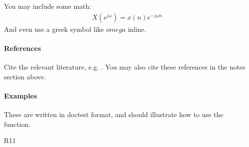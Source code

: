 \documentclass[letterpaper,10pt,english]{sphinxmanual}
\begin{document}
\begin{fulllineitems}
You may include some math:
\begin{equation*}
\begin{split}X(e^{j\omega } ) = x(n)e^{ - j\omega n}\end{split}
\end{equation*}
And even use a greek symbol like \(omega\) inline.
\paragraph{References}

Cite the relevant literature, e.g. \label{\detokenize{subMod:id1}}{\hyperref[\detokenize{subMod:r11}]{\sphinxcrossref{{[}R11{]}}}}.  You may also cite these
references in the notes section above.

\label{\detokenize{subMod:id2}}{\hyperref[\detokenize{subMod:r11}]{\sphinxcrossref{{[}R11{]}}}}
\paragraph{Examples}

These are written in doctest format, and should illustrate how to
use the function.

\begin{sphinxVerbatim}[commandchars=\\\{\}]
  \PYG{p}{[}  \PYG{p}{]}
 \PYG{p}{[}      \PYG{p}{]}
 
\end{sphinxVerbatim}

\end{fulllineitems}


\begin{sphinxthebibliography}{R11}
\end{sphinxthebibliography}
\end{document}
